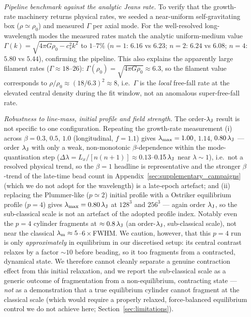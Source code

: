 \documentclass[usenatbib,twoside,twocolumn]{mnras}
\begin{document}
\emph{Pipeline benchmark against the analytic Jeans rate.} To verify that the growth-rate machinery returns physical rates, we seeded a near-uniform self-gravitating box ($\rho\simeq\rho_0$) and measured $\Gamma$ per axial mode. For the well-resolved long-wavelength modes the measured rates match the analytic uniform-medium value $\Gamma(k)=\sqrt{4\pi G\rho_0-c_s^2k^2}$ to $1$--$7\%$ ($n{=}1$: $6.16$ vs $6.23$; $n{=}2$: $6.24$ vs $6.08$; $n{=}4$: $5.80$ vs $5.44$), confirming the pipeline. This also explains the apparently large filament rates ($\Gamma\approx18$--$26$): $\Gamma(\rho_0)=\sqrt{4\pi G\rho_0}\approx6.3$, so the filament value corresponds to $\rho/\rho_0\approx(18/6.3)^2\approx8$, i.e.\ $\Gamma$ is the \emph{local} free-fall rate at the elevated central density during the fit window, not an anomalous super-free-fall rate.

\emph{Robustness to line-mass, initial profile and field strength.} The order-$\lambda_{\rm J}$ result is not specific to one configuration. Repeating the growth-rate measurement (i) across $\beta=0.3$, $0.5$, $1.0$ (longitudinal, $f=1.1$) gives $\lambda_{\rm max}=1.00$, $1.14$, $0.80\,\lambda_{\rm J}$ --- order $\lambda_{\rm J}$ with only a weak, non-monotonic $\beta$-dependence within the mode-quantisation step ($\Delta\lambda=L_x/[n(n{+}1)]\approx0.13$--$0.15\,\lambda_{\rm J}$ near $\lambda\sim1$), i.e.\ not a resolved physical trend, so the $\beta=1$ headline is representative and the stronger $\beta$-trend of the late-time bead count in Appendix~\ref{sec:supplementary_campaigns} (which we do not adopt for the wavelength) is a late-epoch artefact; and (ii) replacing the Plummer-like ($p\simeq2$) initial profile with a Ostriker equilibrium profile ($p=4$) gives $\lambda_{\rm max}=0.80\,\lambda_{\rm J}$ at $128^3$ and $256^3$ --- again order $\lambda_{\rm J}$, so the sub-classical scale is not an artefact of the adopted profile index. Notably even the $p=4$ cylinder fragments at $\approx0.8\,\lambda_{\rm J}$ (an order-$\lambda_{\rm J}$, sub-classical scale), not near the classical $\lambda_{\rm m}\approx5$--$6\times$FWHM. We caution, however, that this $p=4$ run is only \emph{approximately} in equilibrium in our discretised setup: its central contrast relaxes by a factor $\sim10$ before beading, so it too fragments from a contracted, dynamical state. We therefore cannot cleanly separate a genuine contraction effect from this initial relaxation, and we report the sub-classical scale as a generic outcome of fragmentation from a non-equilibrium, contracting state --- \emph{not} as a demonstration that a true equilibrium cylinder cannot fragment at the classical scale (which would require a properly relaxed, force-balanced equilibrium control we do not achieve here; Section~\ref{sec:limitations}).
\end{document}
